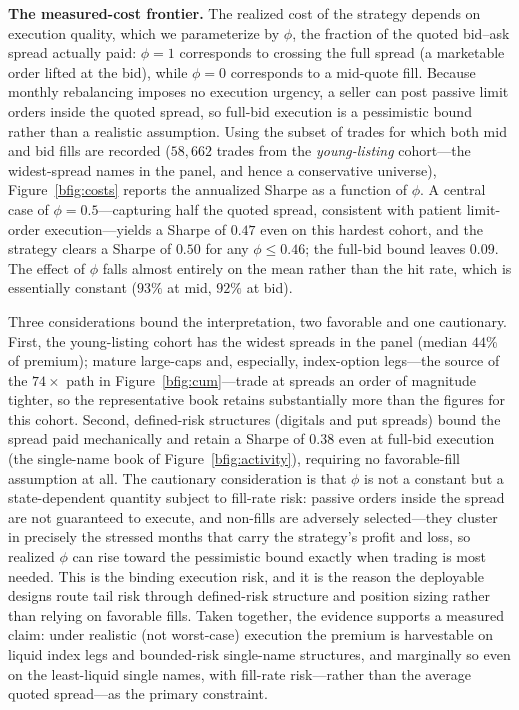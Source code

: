 \documentclass[11pt]{article}
\begin{document}
\noindent\textbf{The measured-cost frontier.} The realized cost of the strategy depends on execution quality, which we parameterize by $\phi$, the fraction of the quoted bid--ask spread actually paid: $\phi=1$ corresponds to crossing the full spread (a marketable order lifted at the bid), while $\phi=0$ corresponds to a mid-quote fill. Because monthly rebalancing imposes no execution urgency, a seller can post passive limit orders inside the quoted spread, so full-bid execution is a pessimistic bound rather than a realistic assumption. Using the subset of trades for which both mid and bid fills are recorded ($58{,}662$ trades from the \emph{young-listing} cohort---the widest-spread names in the panel, and hence a conservative universe), Figure~\ref{bfig:costs} reports the annualized Sharpe as a function of $\phi$. A central case of $\phi=0.5$---capturing half the quoted spread, consistent with patient limit-order execution---yields a Sharpe of $0.47$ even on this hardest cohort, and the strategy clears a Sharpe of $0.50$ for any $\phi\le 0.46$; the full-bid bound leaves $0.09$. The effect of $\phi$ falls almost entirely on the mean rather than the hit rate, which is essentially constant ($93\%$ at mid, $92\%$ at bid).

Three considerations bound the interpretation, two favorable and one cautionary. First, the young-listing cohort has the widest spreads in the panel (median $44\%$ of premium); mature large-caps and, especially, index-option legs---the source of the $74\times$ path in Figure~\ref{bfig:cum}---trade at spreads an order of magnitude tighter, so the representative book retains substantially more than the figures for this cohort. Second, defined-risk structures (digitals and put spreads) bound the spread paid mechanically and retain a Sharpe of $0.38$ even at full-bid execution (the single-name book of Figure~\ref{bfig:activity}), requiring no favorable-fill assumption at all. The cautionary consideration is that $\phi$ is not a constant but a state-dependent quantity subject to fill-rate risk: passive orders inside the spread are not guaranteed to execute, and non-fills are adversely selected---they cluster in precisely the stressed months that carry the strategy's profit and loss, so realized $\phi$ can rise toward the pessimistic bound exactly when trading is most needed. This is the binding execution risk, and it is the reason the deployable designs route tail risk through defined-risk structure and position sizing rather than relying on favorable fills. Taken together, the evidence supports a measured claim: under realistic (not worst-case) execution the premium is harvestable on liquid index legs and bounded-risk single-name structures, and marginally so even on the least-liquid single names, with fill-rate risk---rather than the average quoted spread---as the primary constraint.
\end{document}

